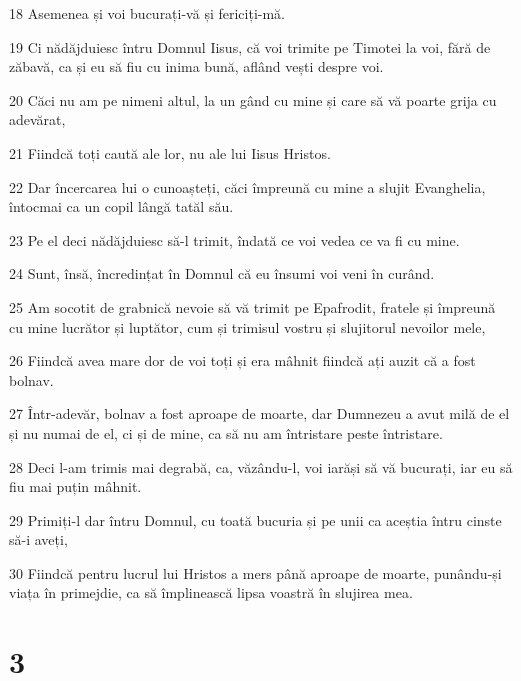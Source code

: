\par 18 Asemenea și voi bucurați-vă și fericiți-mă.
\par 19 Ci nădăjduiesc întru Domnul Iisus, că voi trimite pe Timotei la voi, fără de zăbavă, ca și eu să fiu cu inima bună, aflând vești despre voi.
\par 20 Căci nu am pe nimeni altul, la un gând cu mine și care să vă poarte grija cu adevărat,
\par 21 Fiindcă toți caută ale lor, nu ale lui Iisus Hristos.
\par 22 Dar încercarea lui o cunoașteți, căci împreună cu mine a slujit Evanghelia, întocmai ca un copil lângă tatăl său.
\par 23 Pe el deci nădăjduiesc să-l trimit, îndată ce voi vedea ce va fi cu mine.
\par 24 Sunt, însă, încredințat în Domnul că eu însumi voi veni în curând.
\par 25 Am socotit de grabnică nevoie să vă trimit pe Epafrodit, fratele și împreună cu mine lucrător și luptător, cum și trimisul vostru și slujitorul nevoilor mele,
\par 26 Fiindcă avea mare dor de voi toți și era mâhnit fiindcă ați auzit că a fost bolnav.
\par 27 Într-adevăr, bolnav a fost aproape de moarte, dar Dumnezeu a avut milă de el și nu numai de el, ci și de mine, ca să nu am întristare peste întristare.
\par 28 Deci l-am trimis mai degrabă, ca, văzându-l, voi iarăși să vă bucurați, iar eu să fiu mai puțin mâhnit.
\par 29 Primiți-l dar întru Domnul, cu toată bucuria și pe unii ca aceștia întru cinste să-i aveți,
\par 30 Fiindcă pentru lucrul lui Hristos a mers până aproape de moarte, punându-și viața în primejdie, ca să împlinească lipsa voastră în slujirea mea.

\chapter{3}

